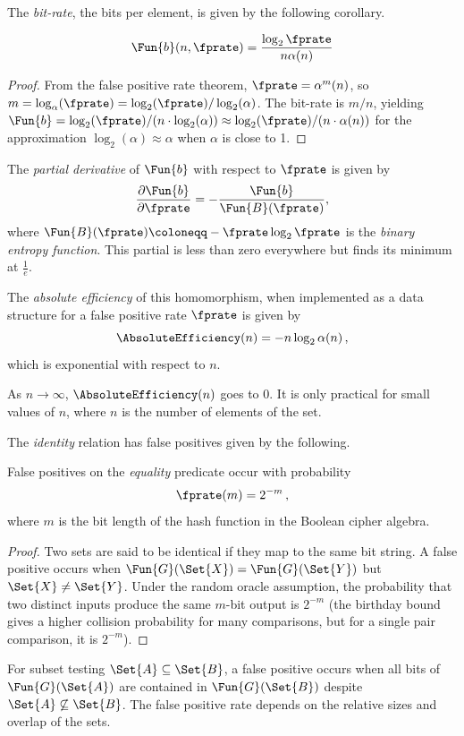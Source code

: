 \documentclass[ ../main.tex]{subfiles}
\begin{document}
The \emph{bit-rate}, the bits per element, is given by the following corollary.
\begin{corollary}
\begin{equation}
	\Fun{b}(n,\fprate) = \frac{\log_2 \fprate}{ n \alpha(n)}
\end{equation}
\end{corollary}
\begin{proof}
From the false positive rate theorem, $\fprate = \alpha^m(n)$, so $m = \log_\alpha(\fprate) = \log_2(\fprate)/\log_2(\alpha)$. The bit-rate is $m/n$, yielding $\Fun{b} = \log_2(\fprate)/(n \cdot \log_2(\alpha)) \approx \log_2(\fprate)/(n \cdot \alpha(n))$ for the approximation $\log_2(\alpha) \approx \alpha$ when $\alpha$ is close to 1.
\end{proof}

The \emph{partial derivative} of $\Fun{b}$ with respect to $\fprate$ is given by
\begin{equation}
	\frac{\partial{\Fun{b}}}{\partial \fprate} = -\frac{\Fun{b}}{\Fun{B}(\fprate)},
\end{equation}
where $\Fun{B}(\fprate) \coloneqq -\fprate \log_2 \fprate$ is the \emph{binary entropy function}.
This partial is less than zero everywhere but finds its minimum at $\frac{1}{e}$.

The \emph{absolute efficiency} of this homomorphism, when implemented as a data structure for a false positive rate $\fprate$ is given by
\begin{equation}
	\AbsoluteEfficiency(n) = -n \log_2 \alpha(n)\,,
\end{equation}
which is exponential with respect to $n$.

As $n \to \infty$, $\AbsoluteEfficiency(n)$ goes to $0$.
It is only practical for small values of $n$, where $n$ is the number of elements of the set.

The \emph{identity} relation has false positives given by the following.
\begin{theorem}
	False positives on the \emph{equality} predicate occur with probability
	\begin{equation}
	\fprate(m) = 2^{-m}\,,
	\end{equation}
	where $m$ is the bit length of the hash function in the Boolean cipher algebra.
\end{theorem}
\begin{proof}
	Two sets are said to be identical if they map to the same bit string. A false positive occurs when $\Fun{G}(\Set{X}) = \Fun{G}(\Set{Y})$ but $\Set{X} \neq \Set{Y}$. Under the random oracle assumption, the probability that two distinct inputs produce the same $m$-bit output is $2^{-m}$ (the birthday bound gives a higher collision probability for many comparisons, but for a single pair comparison, it is $2^{-m}$).
\end{proof}

\begin{remark}
For subset testing $\Set{A} \subseteq \Set{B}$, a false positive occurs when all bits of $\Fun{G}(\Set{A})$ are contained in $\Fun{G}(\Set{B})$ despite $\Set{A} \not\subseteq \Set{B}$. The false positive rate depends on the relative sizes and overlap of the sets.
\end{remark}
\end{document}
